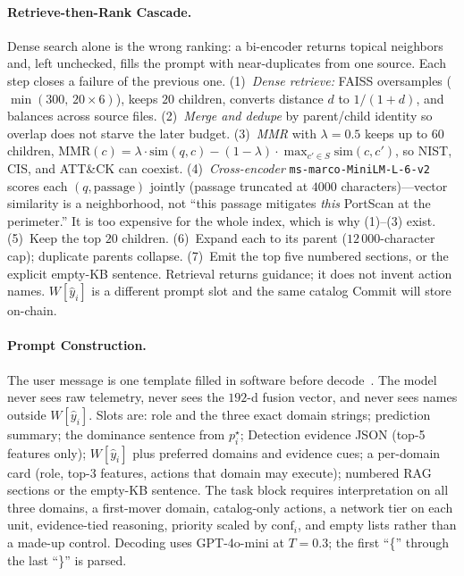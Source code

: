 \paragraph{Retrieve-then-Rank Cascade.}
Dense search alone is the wrong ranking: a bi-encoder returns topical neighbors and, left unchecked, fills the prompt with near-duplicates from one source. Each step closes a failure of the previous one. (1)~\emph{Dense retrieve:} FAISS oversamples ($\min(300,\,20\times 6)$), keeps $20$ children, converts distance $d$ to $1/(1+d)$, and balances across source files. (2)~\emph{Merge and dedupe} by parent/child identity so overlap does not starve the later budget. (3)~\emph{MMR} with $\lambda=0.5$ keeps up to $60$ children, $\mathrm{MMR}(c)=\lambda\cdot\mathrm{sim}(q,c)-(1-\lambda)\cdot\max_{c'\in S}\mathrm{sim}(c,c')$, so NIST, CIS, and ATT\&CK can coexist. (4)~\emph{Cross-encoder} \texttt{ms-marco-MiniLM-L-6-v2} scores each $(q,\mathrm{passage})$ jointly (passage truncated at $4000$ characters)---vector similarity is a neighborhood, not ``this passage mitigates \emph{this} PortScan at the perimeter.'' It is too expensive for the whole index, which is why (1)--(3) exist. (5)~Keep the top $20$ children. (6)~Expand each to its parent ($12\,000$-character cap); duplicate parents collapse. (7)~Emit the top five numbered sections, or the explicit empty-KB sentence. Retrieval returns guidance; it does not invent action names. $W[\hat{y}_i]$ is a different prompt slot and the same catalog Commit will store on-chain.

\paragraph{Prompt Construction.}
The user message is one template filled in software before decode~\cite{xi2023,li2025}. The model never sees raw telemetry, never sees the $192$-d fusion vector, and never sees names outside $W[\hat{y}_i]$. Slots are: role and the three exact domain strings; prediction summary; the dominance sentence from $p_i^{\star}$; Detection evidence JSON (top-5 features only); $W[\hat{y}_i]$ plus preferred domains and evidence cues; a per-domain card (role, top-3 features, actions that domain may execute); numbered RAG sections or the empty-KB sentence. The task block requires interpretation on all three domains, a first-mover domain, catalog-only actions, a network tier on each unit, evidence-tied reasoning, priority scaled by $\mathrm{conf}_i$, and empty lists rather than a made-up control. Decoding uses GPT-4o-mini at $T=0.3$; the first ``\{'' through the last ``\}'' is parsed.

